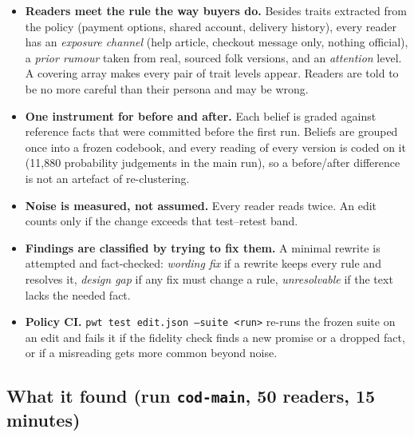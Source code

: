 \documentclass[11pt,a4paper]{article}
\newcommand{\code}[1]{\texttt{#1}}
\begin{document}
\vspace{-1ex}
\begin{itemize}
  \item \textbf{Readers meet the rule the way buyers do.} Besides traits extracted from the policy (payment options, shared account, delivery history), every reader has an \emph{exposure channel} (help article, checkout message only, nothing official), a \emph{prior rumour} taken from real, sourced folk versions, and an \emph{attention} level. A covering array makes every pair of trait levels appear. Readers are told to be no more careful than their persona and may be wrong.
  \item \textbf{One instrument for before and after.} Each belief is graded against reference facts that were committed before the first run. Beliefs are grouped once into a frozen codebook, and every reading of every version is coded on it (11{,}880 probability judgements in the main run), so a before/after difference is not an artefact of re-clustering.
  \item \textbf{Noise is measured, not assumed.} Every reader reads twice. An edit counts only if the change exceeds that test--retest band.
  \item \textbf{Findings are classified by trying to fix them.} A minimal rewrite is attempted and fact-checked: \emph{wording fix} if a rewrite keeps every rule and resolves it, \emph{design gap} if any fix must change a rule, \emph{unresolvable} if the text lacks the needed fact.
  \item \textbf{Policy CI.} \code{pwt test edit.json --suite <run>} re-runs the frozen suite on an edit and fails it if the fidelity check finds a new promise or a dropped fact, or if a misreading gets more common beyond noise.
\end{itemize}

\subsection{What it found (run \code{cod-main}, 50 readers, 15 minutes)}
\end{document}
